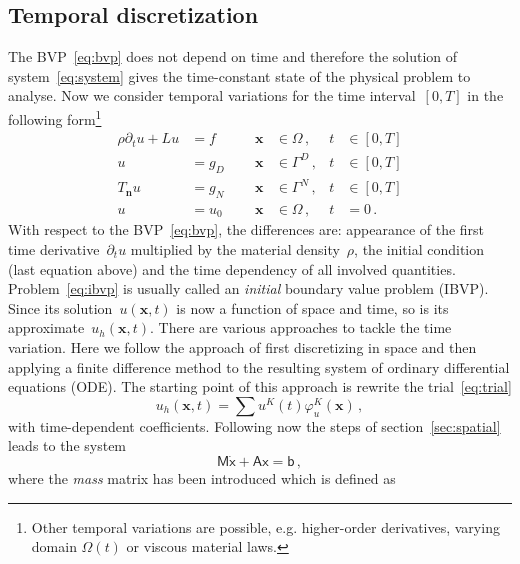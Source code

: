 \documentclass[a4paper,DIV=12,10pt]{scrartcl}
\newcommand{\vek}[1]{\boldsymbol{#1}}  %
\newcommand{\mat}[1]{\mathsf{#1}}      %
\newcommand{\x}[0]{\vek{x}}
\newcommand{\N}[0]{\vek{n}}
\begin{document}
\subsection{Temporal discretization}
\label{sec:temporal}

The BVP~\eqref{eq:bvp} does not depend on time and therefore the
solution of system~\eqref{eq:system} gives the time-constant state of
the physical problem to analyse. Now we consider temporal variations
for the time interval~$[0,T]$ in the following
form\footnote{Other temporal variations are possible,
  e.g. higher-order derivatives, varying domain $\Omega(t)$ or viscous
  material laws.}
\begin{equation}
  \label{eq:ibvp}
  \begin{aligned}
    \rho \partial_t u + L u &= f \qquad 
    &\x &\in \Omega\,, &t &\in [0,T]\\
    u &= g_D    &\x &\in \Gamma^D\,, &t &\in [0,T]\\
    T_{\N}u &= g_N &\x &\in \Gamma^N\,, &t &\in [0,T]\\
    u &= u_0    &\x &\in \Omega\,, &t &=0 \,.
  \end{aligned}
\end{equation}
With respect to the BVP~\eqref{eq:bvp}, the differences are: appearance
of the first time derivative~$\partial_t u$ multiplied by the material
density~$\rho$, the initial condition (last equation above) and the
time dependency of all involved quantities. Problem~\eqref{eq:ibvp} is
usually called an \emph{initial} boundary value problem (IBVP).  Since
its solution~$u(\x,t)$ is now a function of space and time, so is its
approximate~$u_h(\x,t)$. There are various approaches to tackle the
time variation. Here we follow the approach of first discretizing in
space and then applying a finite difference method to the resulting
system of ordinary differential equations (ODE). 
The starting point of this approach is rewrite the trial~\eqref{eq:trial}
\begin{equation}
  \label{eq:ttrial}
  u_h(\x,t) = \sum u^K(t) \varphi_u^K(\x) \,,
\end{equation}
with time-dependent coefficients. Following now the steps of
section~\ref{sec:spatial} leads to the system
\begin{equation}
  \label{eq:ode}
  \mat{M} \dot{\mat{x}} + \mat{A} \mat{x} = \mat{b}\,,
\end{equation}
where the \emph{mass} matrix has been introduced which is defined as
\end{document}
